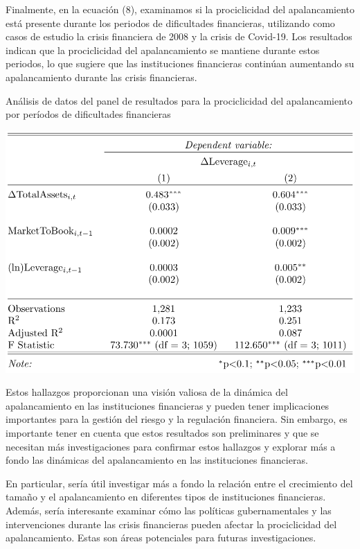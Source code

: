 \documentclass[a4paper,fleqn]{cas-sc}
\begin{document}
Finalmente, en la ecuación (8), examinamos si la prociclicidad del apalancamiento está presente durante los periodos de dificultades financieras, utilizando como casos de estudio la crisis financiera de 2008 y la crisis de Covid-19. Los resultados indican que la prociclicidad del apalancamiento se mantiene durante estos periodos, lo que sugiere que las instituciones financieras continúan aumentando su apalancamiento durante las crisis financieras.

\begin{table}[h]
	\centering
	\caption{Análisis de datos del panel de resultados para la prociclicidad del apalancamiento por períodos de dificultades financieras}
	\includegraphics[width=.6\textwidth]{tabla7.png}
\end{table}

Estos hallazgos proporcionan una visión valiosa de la dinámica del apalancamiento en las instituciones financieras y pueden tener implicaciones importantes para la gestión del riesgo y la regulación financiera. Sin embargo, es importante tener en cuenta que estos resultados son preliminares y que se necesitan más investigaciones para confirmar estos hallazgos y explorar más a fondo las dinámicas del apalancamiento en las instituciones financieras.

En particular, sería útil investigar más a fondo la relación entre el crecimiento del tamaño y el apalancamiento en diferentes tipos de instituciones financieras. Además, sería interesante examinar cómo las políticas gubernamentales y las intervenciones durante las crisis financieras pueden afectar la prociclicidad del apalancamiento. Estas son áreas potenciales para futuras investigaciones.
\end{document}
